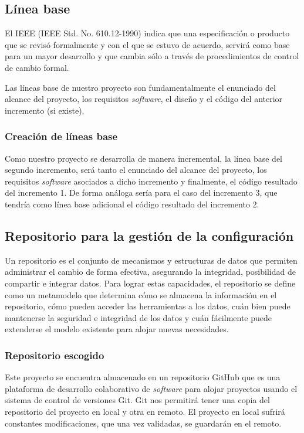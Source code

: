 \subsection{Línea base}
El IEEE (IEEE Std. No. 610.12-1990) indica que una especificación o producto que se revisó formalmente y con el que se estuvo de acuerdo, servirá como base para un mayor desarrollo y que cambia sólo a través de procedimientos de control de cambio formal.


Las líneas base de nuestro proyecto son fundamentalmente el enunciado del alcance del proyecto, los requisitos \textit{software}, el diseño y el código del anterior incremento (si existe).

\subsubsection{Creación de líneas base}
Como nuestro proyecto se desarrolla de manera incremental, la línea base del segundo incremento, será tanto el enunciado del alcance del proyecto, los requisitos \textit{software} asociados a dicho incremento y finalmente, el código resultado del incremento 1. De forma análoga sería para el caso del incremento 3, que tendría como línea base adicional el código resultado del incremento 2.

\subsection{Repositorio para la gestión de la configuración}
Un repositorio es el conjunto de mecanismos y estructuras de datos que permiten administrar el cambio de forma efectiva, asegurando la integridad, posibilidad de compartir e integrar datos. Para lograr estas capacidades, el repositorio se define como un metamodelo que determina cómo se almacena la información en el repositorio, cómo pueden acceder las herramientas a los datos, cuán bien puede mantenerse la seguridad e integridad de los datos y cuán fácilmente puede extenderse el modelo existente para alojar nuevas necesidades\cite{pressman}.

\subsubsection{Repositorio escogido}
Este proyecto se encuentra almacenado en un repositorio GitHub que es una plataforma de desarrollo colaborativo de \textit{software} para alojar proyectos usando el sistema de control de versiones Git\cite{github}. Git nos permitirá tener una copia del repositorio del proyecto en local y otra en remoto. El proyecto en local sufrirá constantes modificaciones, que una vez validadas, se guardarán en el remoto.

